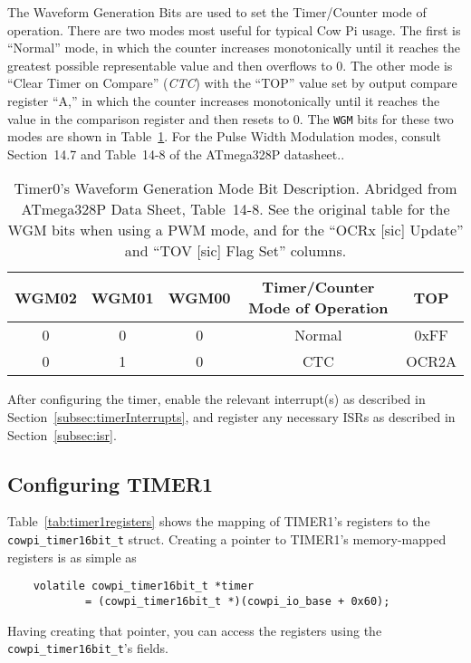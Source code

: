 The Waveform Generation Bits are used to set the Timer/Counter mode of operation.
There are two modes most useful for typical Cow Pi usage.
The first is ``Normal'' mode, in which the counter increases monotonically until it reaches the greatest possible representable value and then overflows to 0.
The other mode is ``Clear Timer on Compare'' (\textit{CTC}) with the ``TOP'' value set by output compare register ``A,'' in which the counter increases monotonically until it reaches the value in the comparison register and then resets to 0.
The \texttt{WGM} bits for these two modes are shown in Table~\ref{tab:timer0wgm}.
For the Pulse Width Modulation modes, consult Section~14.7 and Table~14\mbox{-}8 of the ATmega328P datasheet.\cite{ATmega328P}.

\begin{table}[h]
    \centering \small
    \begin{tabular}{|c|c|c|c|c|} \hline
    \textbf{WGM02}    & \textbf{WGM01}    & \textbf{WGM00}    & \textbf{Timer/Counter Mode of Operation}  & TOP    \\ \hline\hline
    0                 & 0                 & 0                 & Normal                                    & 0xFF   \\ \hline
    0                 & 1                 & 0                 & CTC                                       & OCR2A  \\ \hline
    \end{tabular}
    \caption{Timer0's Waveform Generation Mode Bit Description. \tiny Abridged from ATmega328P Data Sheet, Table~14\mbox{-}8.\cite{ATmega328P} See the original table for the WGM bits when using a PWM mode, and for the ``OCRx [sic] Update'' and ``TOV [sic] Flag Set'' columns. \label{tab:timer0wgm}}
\end{table}

After configuring the timer, enable the relevant interrupt(s) as described in Section~\ref{subsec:timerInterrupts}, and register any necessary ISRs as described in Section~\ref{subsec:isr}.


\subsection{Configuring TIMER1}

Table~\ref{tab:timer1registers} shows the mapping of TIMER1's registers to the \lstinline{cowpi_timer16bit_t} struct.
Creating a pointer to TIMER1's memory-mapped registers is as simple as
\begin{lstlisting}
    volatile cowpi_timer16bit_t *timer
            = (cowpi_timer16bit_t *)(cowpi_io_base + 0x60);
\end{lstlisting}
Having creating that pointer, you can access the registers using the \lstinline{cowpi_timer16bit_t}'s fields.


